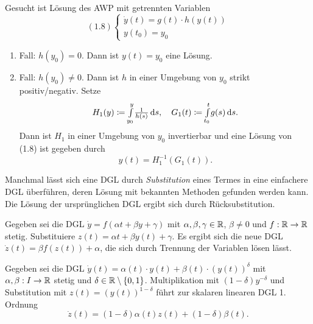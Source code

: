 \documentclass{cheat-sheet}
\begin{document}
\begin{prob}
  Gesucht ist Lösung des AWP mit getrennten Variablen
  \[
    (1.8) \left\{ \begin{array}{l}
      \dot{y}(t) = g(t) \cdot h(y(t))\\
      y(t_0) = y_0
    \end{array} \right.
  \]
\end{prob}

\begin{lsg}
  \begin{enumerate}
    \item Fall: $h(y_0) = 0$. Dann ist $y(t) = y_0$ eine Lösung.
    \item Fall: $h(y_0) \not= 0$. Dann ist $h$ in einer Umgebung von $y_0$ strikt positiv/negativ. Setze
    \[
      H_1(y) \coloneqq {\textstyle \int\limits_{y_0}^{y}} \tfrac{1}{h(s)} \,\mathrm{d} s, \quad
      G_1(t) \coloneqq {\textstyle \int\limits_{t_0}^{t}} g(s) \,\mathrm{d} s.
    \]
    Dann ist $H_1$ in einer Umgebung von $y_0$ invertierbar und eine Lösung von (1.8) ist gegeben durch
    \[ y(t) = H_1^{-1}(G_1(t)). \]
  \end{enumerate}
\end{lsg}


\begin{technik}[Transformation]
  Manchmal lässt sich eine DGL durch \emph{Substitution} eines Termes in eine einfachere DGL überführen, deren Lösung mit bekannten Methoden gefunden werden kann. Die Lösung der ursprünglichen DGL ergibt sich durch Rücksubstitution.
\end{technik}

\begin{bsp}
  Gegeben sei die DGL $\dot{y} = f(\alpha t + \beta y + \gamma)$ mit $\alpha, \beta, \gamma \in \mathbb{R}$, $\beta \not= 0$ und $f : \mathbb{R} \to \mathbb{R}$ stetig. Substituiere $z(t) = \alpha t + \beta y(t) + \gamma$. Es ergibt sich die neue DGL $\dot{z}(t) = \beta f(z(t)) + \alpha$, die sich durch Trennung der Variablen lösen lässt.
\end{bsp}

\begin{bsp}
  Gegeben sei die DGL $\dot{y}(t) = \alpha(t) \cdot y(t) + \beta(t) \cdot (y(t))^{\delta}$ mit $\alpha, \beta : I \to \mathbb{R}$ stetig und $\delta \in \mathbb{R} \setminus \{0,1\}$. Multiplikation mit $(1-\delta) y^{-\delta}$ und Substitution mit $z(t) = (y(t))^{1-\delta}$ führt zur skalaren linearen DGL 1. Ordnung
  \[ \dot{z}(t) = (1-\delta) \alpha(t) z(t) + (1-\delta) \beta(t). \]
\end{bsp}
\end{document}
